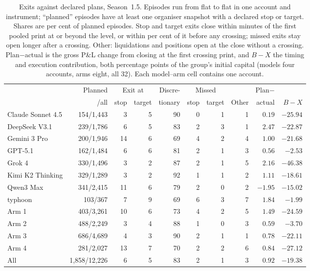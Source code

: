 \begin{table}[ht]
\centering\small
\caption{Exits against declared plans, Season~1.5. Episodes run from flat to
flat in one account and instrument; ``planned'' episodes have at least one
organiser snapshot with a declared stop or target. Shares are per cent of
planned episodes. Stop and target exits close within \alExitGrace{} minutes of
the first pooled print at or beyond the level, or within \alExitNear{} per
cent of it before any crossing; missed exits stay open longer after a
crossing. Other: liquidations and positions open at the close without a
crossing. Plan$-$actual is the gross P\&L change from closing at the first
crossing print, and $B-X$ the timing and execution contribution, both
percentage points of the group's initial capital (models four accounts,
arms eight, all 32). Each model--arm cell contains one account.}
\label{tab:exitplan}
\setlength{\tabcolsep}{3.5pt}
\begin{tabular}{lrrrrrrrrr}
\toprule
 & Planned & \multicolumn{2}{c}{Exit at} & Discre- & \multicolumn{2}{c}{Missed} & & Plan$-$ & \\
 & /all & stop & target & tionary & stop & target & Other & actual & $B-X$ \\
\midrule
Claude Sonnet 4.5 & 154/1{,}443 & 3 & 5 & 90 & 0 & 1 & 1 & $0.19$ & $\ensuremath{-}25.94$ \\
DeepSeek V3.1 & 239/1{,}786 & 6 & 5 & 83 & 2 & 3 & 1 & $2.47$ & $\ensuremath{-}22.87$ \\
Gemini 3 Pro & 200/1{,}946 & 14 & 6 & 69 & 4 & 2 & 4 & $1.00$ & $\ensuremath{-}21.68$ \\
GPT-5.1 & 162/1{,}484 & 6 & 6 & 81 & 2 & 1 & 3 & $0.56$ & $\ensuremath{-}2.53$ \\
Grok 4 & 330/1{,}496 & 3 & 2 & 87 & 2 & 1 & 5 & $2.16$ & $\ensuremath{-}46.38$ \\
Kimi K2 Thinking & 329/1{,}289 & 3 & 2 & 92 & 1 & 1 & 2 & $1.11$ & $\ensuremath{-}18.61$ \\
Qwen3 Max & 341/2{,}415 & 11 & 6 & 79 & 2 & 0 & 2 & $\ensuremath{-}1.95$ & $\ensuremath{-}15.02$ \\
typhoon & 103/367 & 7 & 9 & 69 & 6 & 3 & 7 & $1.84$ & $\ensuremath{-}1.99$ \\
\midrule
Arm 1 & 403/3{,}261 & 10 & 6 & 73 & 4 & 2 & 5 & $1.49$ & $\ensuremath{-}24.59$ \\
Arm 2 & 488/2{,}249 & 3 & 4 & 88 & 1 & 0 & 3 & $0.59$ & $\ensuremath{-}3.70$ \\
Arm 3 & 686/4{,}689 & 4 & 3 & 90 & 2 & 1 & 1 & $0.78$ & $\ensuremath{-}22.11$ \\
Arm 4 & 281/2{,}027 & 13 & 7 & 70 & 2 & 2 & 6 & $0.84$ & $\ensuremath{-}27.12$ \\
\midrule
All & 1{,}858/12{,}226 & 6 & 5 & 83 & 2 & 1 & 3 & $0.92$ & $\ensuremath{-}19.38$ \\
\bottomrule
\end{tabular}
\end{table}
